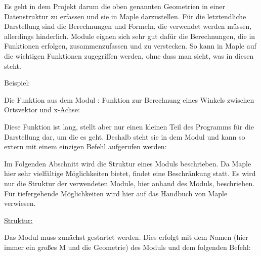 Es geht in dem Projekt darum die oben genannten Geometrien in einer Datenstruktur zu erfassen und sie in Maple darzustellen. Für die letztendliche Darstellung sind die Berechnungen und Formeln, die verwendet werden müssen, allerdings hinderlich. Module eignen sich sehr gut dafür die Berechnungen, die in Funktionen erfolgen, zusammenzufassen und zu verstecken. So kann in Maple auf die wichtigen Funktionen zugegriffen werden, ohne dass man sieht, was in diesen steht. \medskip

Beispiel:

Die Funktion  aus dem Modul : Funktion zur Berechnung eines Winkels zwischen Ortsvektor und x-Achse:

\begin{alltt}
\end{alltt}

Diese Funktion ist lang, stellt aber nur einen kleinen Teil des Programms für die Darstellung dar, um die es geht. Deshalb steht sie in dem Modul und kann so extern mit einem einzigen Befehl aufgerufen werden: 

\medskip


\bigskip

Im Folgenden Abschnitt wird die Struktur eines Moduls beschrieben. Da Maple hier sehr vielfältige  Möglichkeiten bietet, findet eine Beschränkung statt. Es wird nur die Struktur der verwendeten Module, hier anhand des Moduls, beschrieben. Für tiefergehende Möglichkeiten wird hier auf das Handbuch von Maple \autocite{Wat:2017a} verwiesen.

\bigskip

\underline{Struktur:}

\bigskip

Das Modul muss zunächst gestartet werden. Dies erfolgt mit dem Namen (hier immer ein großes M und die Geometrie) des Moduls und dem folgenden Befehl:

